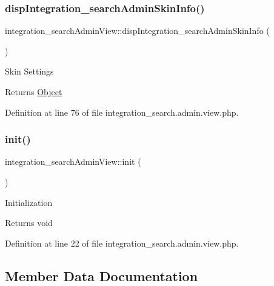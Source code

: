 \subsubsection{\texorpdfstring{disp\+Integration\+\_\+search\+Admin\+Skin\+Info()}{dispIntegration\_searchAdminSkinInfo()}}
{\footnotesize\ttfamily integration\+\_\+search\+Admin\+View\+::disp\+Integration\+\_\+search\+Admin\+Skin\+Info (\begin{DoxyParamCaption}{ }\end{DoxyParamCaption})}

Skin Settings

\begin{DoxyReturn}{Returns}
\hyperlink{classObject}{Object} 
\end{DoxyReturn}


Definition at line 76 of file integration\+\_\+search.\+admin.\+view.\+php.

\hypertarget{classintegration__searchAdminView_af4c9058a54a1923c25d9c90aeb405887}{}\label{classintegration__searchAdminView_af4c9058a54a1923c25d9c90aeb405887} 
\subsubsection{\texorpdfstring{init()}{init()}}
{\footnotesize\ttfamily integration\+\_\+search\+Admin\+View\+::init (\begin{DoxyParamCaption}{ }\end{DoxyParamCaption})}

Initialization

\begin{DoxyReturn}{Returns}
void 
\end{DoxyReturn}


Definition at line 22 of file integration\+\_\+search.\+admin.\+view.\+php.



\subsection{Member Data Documentation}
\hypertarget{classintegration__searchAdminView_ae36349da9a0e5548b5fdc222420a5bc5}{}\label{classintegration__searchAdminView_ae36349da9a0e5548b5fdc222420a5bc5} 
